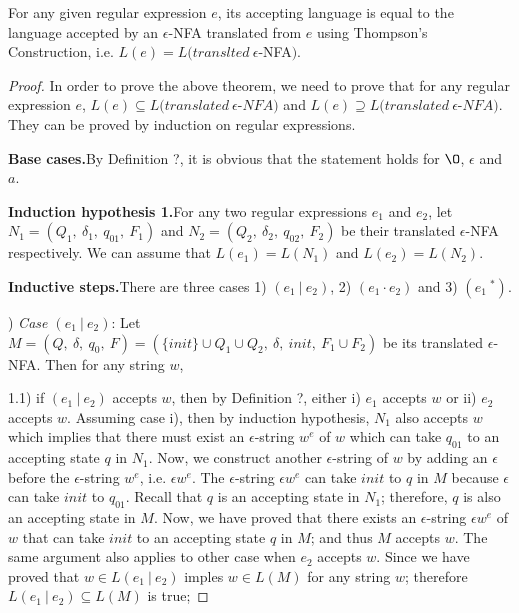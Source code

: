 \begin{thm} 
\noindent For any given regular expression \(e\), its accepting
language is equal to the language accepted by an \(\epsilon\)-NFA
translated from \(e\) using Thompson's Construction, i.e. \(L(e) =
L(translted\ \epsilon\)-NFA\()\). 
\end{thm} 

\begin{proof}
\noindent In order to prove the above theorem, we need to prove that
for any regular expression \(e\), \(L(e) \subseteq
L(translated\ \epsilon\)-\(NFA)\) and \(L(e) \supseteq L(translated\
\epsilon\)-\(NFA)\). They can be proved by induction on regular
expressions. 

\par \noindent \textbf{Base cases.}\quad By Definition ?, it is
obvious that the statement holds for \(\O\), \(\epsilon\) and
\(a\). 

\par \noindent \textbf{Induction hypothesis 1.}\quad For any two regular expressions
\(e_1\) and \(e_2\), let \(N_1 =
(Q_1,\ \delta_1,\ q_{01},\ F_1)\) and \(N_2 = (Q_2,\ \delta_2,\
q_{02},\ F_2)\) be their translated \(\epsilon\)-NFA 
respectively. We can assume that \(L(e_1) = L(N_1)\) and \(L(e_2) =
L(N_2)\). 

\par \noindent \textbf{Inductive steps.}\quad There are three cases 1)
\((e_1\ |\ e_2)\), 2) \((e_1 \cdot e_2)\) and 3) \((e_1\ ^*)\). 

\par \noindent 1) \textit{Case \((e_1\ |\ e_2)\)}: Let \(M = (Q,\ \delta,\ q_0,\ F) = (\{init\} \cup Q_1 \cup Q_2,\
\delta,\ init,\ F_1 \cup F_2)\) be its translated \(\epsilon\)-NFA. Then for any string \(w\), 

\par 1.1) if \((e_1\ |\ e_2)\) accepts \(w\), then by Definition ?,
either i) \(e_1\) accepts \(w\) or ii) \(e_2\) accepts \(w\). Assuming case i), then by
induction hypothesis, \(N_1\) also accepts \(w\) which implies that
there must exist an \(\epsilon\)-string \(w^e\) of \(w\) which can take \(q_{01}\)
to an accepting state \(q\) in \(N_1\). Now, we construct
another \(\epsilon\)-string of \(w\) by adding an \(\epsilon\) before the
\(\epsilon\)-string \(w^e\), i.e. \(\epsilon w^e\). The \(\epsilon\)-string \(\epsilon w^e\) can
take \(init\) to \(q\) in \(M\) because \(\epsilon\) can take \(init\)
to \(q_{01}\). Recall that \(q\) is an accepting
state in \(N_1\); therefore, \(q\) is also an accepting state in
\(M\). Now, we have proved that there exists an \(\epsilon\)-string
\(\epsilon w^e\) of \(w\) that can take \(init\) to an accepting state
\(q\) in \(M\); and thus \(M\) accepts \(w\). The same argument also applies
to other case when \(e_2\) accepts \(w\). Since we have proved that
\(w \in L(e_1\ |\ e_2)\) imples \(w \in L(M)\) for any string \(w\);
therefore \(L(e_1\ |\ e_2) \subseteq L(M)\) is true; 


\end{proof}
